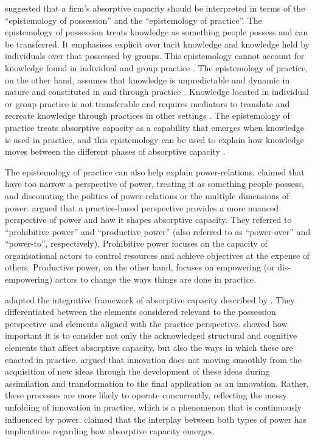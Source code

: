 \citet{marabelli2014knowing} suggested that a firm's absorptive capacity should be interpreted in terms of the \enquote{epistemology of possession} and the \enquote{epistemology of practice}. The epistemology of possession treats knowledge as something people possess and can be transferred. It emphasises explicit over tacit knowledge and knowledge held by individuals over that possessed by groups. This epistemology cannot account for knowledge found in individual and group practice \citep{cook1999bridging}. The epistemology of practice, on the other hand, assumes that knowledge is unpredictable and dynamic in nature and constituted in and through practice \citep{marabelli2014knowing}. Knowledge located in individual or group practice is not transferable and requires mediators to translate and recreate knowledge through practices in other settings \citep{marabelli2012knowledge}. The epistemology of practice treats absorptive capacity as a capability that emerges when knowledge is used in practice, and this epistemology can be used to explain how knowledge moves between the different phases of absorptive capacity \citep{marabelli2014knowing}. \medskip

The epistemology of practice can also help explain power-relations. \citet{marabelli2014knowing} claimed that \citet{todorova2007absorptive} have too narrow a perspective of power, treating it as something people possess, and discounting the politics of power-relations or the multiple dimensions of power. \citet{marabelli2014knowing} argued that a practice-based perspective provides a more nuanced perspective of power and how it shapes absorptive capacity. They referred to \enquote{prohibitive power} and \enquote{productive power} (also referred to as \enquote{power-over} and \enquote{power-to}, respectively). Prohibitive power focuses on the capacity of organisational actors to control resources and achieve objectives at the expense of others. Productive power, on the other hand, focuses on empowering (or dis-empowering) actors to change the ways things are done in practice. \medskip

\citet{marabelli2014knowing} adapted the integrative framework of absorptive capacity described by \citet{volberda2010perspective}. They differentiated between the elements considered relevant to the possession perspective and elements aligned with the practice perspective. \citet{marabelli2014knowing} showed how important it is to consider not only the acknowledged structural and cognitive elements that affect absorptive capacity, but also the ways in which these are enacted in practice. \citet{marabelli2014knowing} argued that innovation does not moving smoothly from the acquisition of new ideas through the development of these ideas during assimilation and transformation to the final application as an innovation. Rather, these processes are more likely to operate concurrently, reflecting the messy unfolding of innovation in practice, which is a phenomenon that is continuously influenced by power. \citet{marabelli2014knowing} claimed that the interplay between both types of power has implications regarding how absorptive capacity emerges. \medskip

